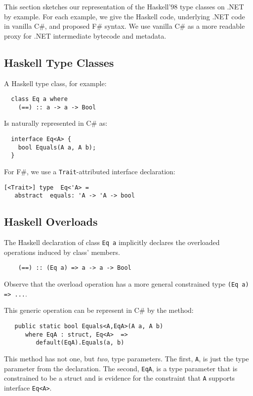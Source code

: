\documentclass[preprint]{sig-alternate-05-2015}
\newif\ifclassic
\begin{document}
This section sketches our representation of the Haskell'98 type classes on .NET by example.
For each example, we give the Haskell code, underlying .NET code in vanilla C\#, and proposed F\# syntax.
We use vanilla C\# as a more readable proxy for .NET intermediate bytecode and metadata.

\subsection{Haskell Type Classes}

A Haskell type class, for example:

{
\begin{lstlisting}
  class Eq a where 
    (==) :: a -> a -> Bool
\end{lstlisting}
}
Is naturally represented in C\# as:
\begin{lstlisting}
  interface Eq<A> {
    bool Equals(A a, A b);
  }
\end{lstlisting}

\ifclassic
For new F\# syntax we adopt the keyword \lstinline{concept} (\lstinline{class} is already taken):

\lstset{language={FSharp}}
\begin{lstlisting}
concept Eq 'a where 
    (==): 'a -> 'a -> bool
\end{lstlisting}
\else
For F\#, we use a  \lstinline{Trait}-attributed interface declaration:
\begin{lstlisting}
[<Trait>] type  Eq<'A> = 
   abstract  equals: 'A -> 'A -> bool
\end{lstlisting}
\fi
 
\subsection{Haskell Overloads}

The Haskell declaration of class \lstinline{Eq a} implicitly declares the overloaded 
operations induced by class' members.

\begin{lstlisting}
    (==) :: (Eq a) => a -> a -> Bool 
\end{lstlisting}
Observe that the overload operation has a more general constrained type \lstinline{(Eq a) => ...}.

This generic operation can be represent in C\# by the method:
\begin{lstlisting}
   public static bool Equals<A,EqA>(A a, A b) 
      where EqA : struct, Eq<A>  =>
         default(EqA).Equals(a, b)
\end{lstlisting}
This method has not one, but \emph{two}, type parameters. The first, \lstinline{A}, is just the type parameter from the declaration.
The second, \lstinline{EqA}, is a type parameter that is constrained to be a struct and is evidence for the constraint that \lstinline{A} supports interface \lstinline{Eq<A>}.
\end{document}
